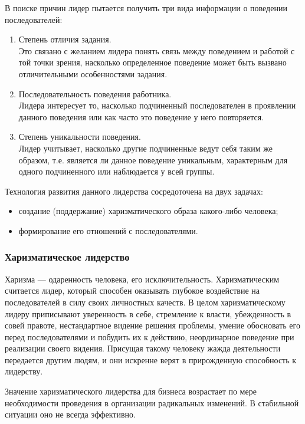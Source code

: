 \documentclass[a4paper,12pt,oneside,final]{extarticle}
\numberwithin{equation}{section}
\begin{document}
В поиске причин лидер пытается получить три вида информации о поведении последователей:
\begin{enumerate}
	\item Степень отличия задания. \\
	Это связано с желанием лидера понять связь между поведением и работой с той точки зрения, насколько определенное поведение может быть вызвано отличительными особенностями задания. 
	\item Последовательность поведения работника. \\ 
	Лидера интересует то, насколько подчиненный последователен в проявлении данного поведения или как часто это поведение у него повторяется.
	\item Степень уникальности поведения. \\
	Лидер учитывает, насколько другие подчиненные ведут себя таким же образом, т.е. является ли данное поведение уникальным, характерным для одного подчиненного или наблюдается у всей группы. 
\end{enumerate}

Технология развития данного лидерства сосредоточена на двух задачах:
\begin{itemize}
	\item создание (поддержание) харизматического образа какого-либо человека;
	\item формирование его отношений с последователями. 
\end{itemize}

\subsubsection{Харизматическое лидерство}
Харизма --- одаренность человека, его исключительность. 
Харизматическим считается лидер, который способен оказывать глубокое воздействие на последователей в силу своих личностных качеств. 
В целом харизматическому лидеру приписывают уверенность в себе, стремление к власти, убежденность в совей правоте, нестандартное видение решения проблемы, умение обосновать его перед последователями и побудить их к действию, неординарное поведение при реализации своего видения. 
Присущая такому человеку жажда деятельности передается другим людям, и они искренне верят в прирожденную способность к лидерству. 

Значение харизматического лидерства для бизнеса возрастает по мере необходимости проведения в организации радикальных изменений. 
В стабильной ситуации оно не всегда эффективно. 
\end{document}
